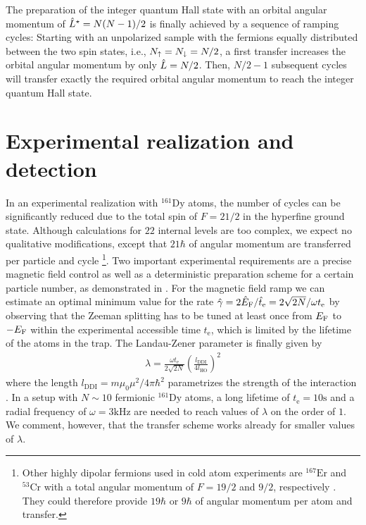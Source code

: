 The preparation of the integer quantum Hall state with an orbital angular momentum of ${\hat L}^{\star} = N(N-1)/2$ is finally achieved by a sequence of ramping cycles: Starting with an unpolarized sample with the fermions equally distributed between the two spin states, i.e.,  $N_\uparrow=N_\downarrow=N/2$, a first transfer increases the orbital angular momentum by only ${\hat L}=N/2$. Then, $N/2-1$ subsequent cycles will transfer exactly the required orbital angular momentum to reach the integer quantum Hall state.

\section{Experimental realization and detection}

In an experimental realization with $^{161}\text{Dy}$ atoms, the number of cycles can be significantly reduced due to the total spin of $F=21/2$ in the hyperfine ground state. Although calculations for $22$ internal levels are too complex, we expect no qualitative modifications, except that $21\hbar$ of angular momentum are transferred per particle and cycle \footnote{Other highly dipolar fermions used in cold atom experiments are $^{167}\text{Er}$ and $^{53}\text{Cr}$ with a total angular momentum of $F=19/2$ and $9/2$, respectively \cite{Berglund2007,Chicireanu2006}. They could therefore provide $19\hbar$ or $9\hbar$ of angular momentum per atom and transfer.}. Two important experimental requirements are a precise magnetic field control \cite{Pasquiou2011} as well as a deterministic preparation scheme for a certain particle number, as demonstrated in \cite{Serwane2011}. For the magnetic field ramp we can estimate an optimal minimum value for the rate ${\hat \gamma}=2{\hat E}_\text{F}/{\hat t}_\text{e}=2\sqrt{2N}/\omega t_\text{e}$ by observing that the Zeeman splitting has to be tuned at least once from $E_\text{F}$ to $-E_\text{F}$ within the experimental accessible time $t_\text{e}$, which is limited by the lifetime of the atoms in the trap. The Landau-Zener parameter is finally given by
\begin{align*}
\lambda = \frac{\omega t_\text{e}}{2\sqrt{2N}} \left(\frac{l_\text{DDI}}{4 l_\text{HO}}\right)^2
\end{align*}
where the length $l_\text{DDI} = m\mu_0\mu^2/4\pi \hbar^2$ parametrizes the strength of the interaction \cite{Lu2012}. In a setup with $N\sim 10$ fermionic $^{161}\text{Dy}$ atoms, a long lifetime of $t_\text{e}=10\text{s}$ and a radial frequency of $\omega = 3\text{kHz}$ are needed to reach values of $\lambda$ on the order of $1$. We comment, however, that the transfer scheme works already for smaller values of $\lambda$.

